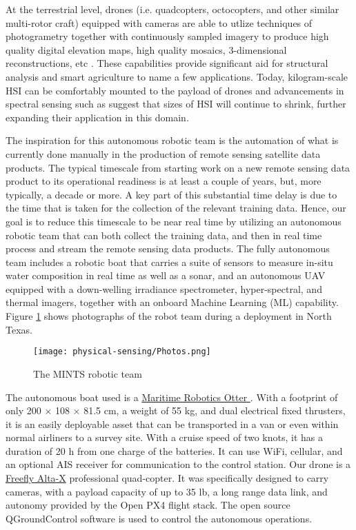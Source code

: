 At the terrestrial level, drones (i.e. quadcopters, octocopters, and other similar multi-rotor craft) equipped with cameras are able to utlize techniques of photogrametry together with continuously sampled imagery to produce high quality digital elevation maps, high quality mosaics, 3-dimensional reconstructions, etc \cite{copernicus-odm}. These capabilities provide significant aid for structural analysis and smart agriculture to name a few applications. Today, kilogram-scale HSI can be comfortably mounted to the payload of drones and advancements in spectral sensing such as \cite{minot-spectrometer} suggest that sizes of HSI will continue to shrink, further expanding their application in this domain.

The inspiration for this autonomous robotic team is the automation of what is currently done manually in the production of remote sensing satellite data products. The typical timescale from starting work on a new remote sensing data product to its operational readiness is at least a couple of years, but, more typically, a decade or more. A key part of this substantial time delay is due to the time that is taken for the collection of the relevant training data. Hence, our goal is to reduce this timescale to be near real time by utilizing an autonomous robotic team that can both collect the training data, and then in real time process and stream the remote sensing data products. The fully autonomous team includes a robotic boat that carries a suite of sensors to measure in-situ water composition in real time as well as a sonar, and an autonomous UAV equipped with a down-welling irradiance spectrometer, hyper-spectral, and thermal imagers, together with an onboard Machine Learning (ML) capability. Figure \ref{fig:drone-team} shows photographs of the robot team during a deployment in North Texas.

\begin{figure}[!hbt]
  \centering
  \texttt{[image: physical-sensing/Photos.png]}
  \caption{The MINTS robotic team}
  \label{fig:drone-team}
\end{figure}

The autonomous boat used is a \href{https://www.maritimerobotics.com/otter}{Maritime Robotics Otter }. With a footprint of only 200 × 108 × 81.5 cm, a weight of 55 kg, and dual electrical fixed thrusters, it is an easily deployable asset that can be transported in a van or even within normal airliners to a survey site. With a cruise speed of two knots, it has a duration of 20 h from one charge of the batteries. It can use WiFi, cellular, and an optional AIS receiver for communication to the control station. Our drone is a \href{https://freeflysystems.com/alta-x}{Freefly Alta-X} professional quad-copter. It was specifically designed to carry cameras, with a payload capacity of up to 35 lb, a long range data link, and autonomy provided by the Open PX4 flight stack. The open source QGroundControl software is used to control the autonomous operations.

